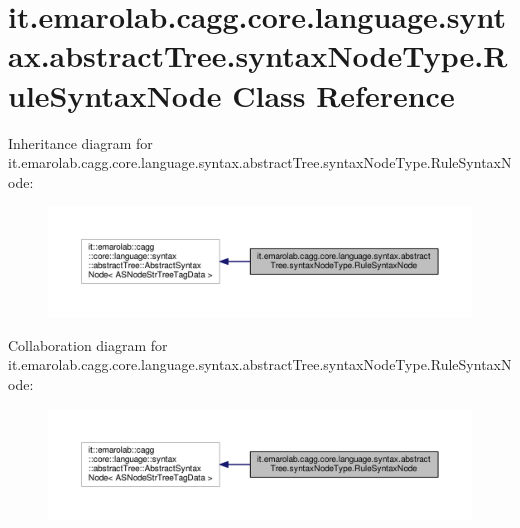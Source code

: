 \hypertarget{classit_1_1emarolab_1_1cagg_1_1core_1_1language_1_1syntax_1_1abstractTree_1_1syntaxNodeType_1_1RuleSyntaxNode}{\section{it.\-emarolab.\-cagg.\-core.\-language.\-syntax.\-abstract\-Tree.\-syntax\-Node\-Type.\-Rule\-Syntax\-Node Class Reference}
\label{classit_1_1emarolab_1_1cagg_1_1core_1_1language_1_1syntax_1_1abstractTree_1_1syntaxNodeType_1_1RuleSyntaxNode}
}


Inheritance diagram for it.\-emarolab.\-cagg.\-core.\-language.\-syntax.\-abstract\-Tree.\-syntax\-Node\-Type.\-Rule\-Syntax\-Node\-:\nopagebreak
\begin{figure}[H]
\begin{center}
\leavevmode
\includegraphics[width=350pt]{classit_1_1emarolab_1_1cagg_1_1core_1_1language_1_1syntax_1_1abstractTree_1_1syntaxNodeType_1_1RuleSyntaxNode__inherit__graph}
\end{center}
\end{figure}


Collaboration diagram for it.\-emarolab.\-cagg.\-core.\-language.\-syntax.\-abstract\-Tree.\-syntax\-Node\-Type.\-Rule\-Syntax\-Node\-:\nopagebreak
\begin{figure}[H]
\begin{center}
\leavevmode
\includegraphics[width=350pt]{classit_1_1emarolab_1_1cagg_1_1core_1_1language_1_1syntax_1_1abstractTree_1_1syntaxNodeType_1_1RuleSyntaxNode__coll__graph}
\end{center}
\end{figure}
